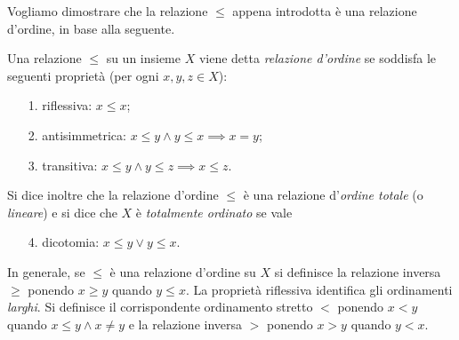 Vogliamo dimostrare che la relazione $\le$ appena introdotta 
è una relazione d'ordine, in base alla seguente.

\begin{definition}
  \label{def:ordine}%
  Una relazione
  $\le$ su un insieme $X$ viene detta
  \emph{relazione d'ordine}%
%
  se soddisfa le seguenti proprietà (per ogni $x,y,z\in X$):
  \begin{enumerate}
    \item[1.] riflessiva: $x\le x$;
    \item[2.] antisimmetrica: $x\le y \land y\le x \implies x=y$;
    \item[3.] transitiva: $x\le y \land y\le z \implies x\le z$.
  \end{enumerate}
  Si dice inoltre che la relazione d'ordine $\le$
  è una relazione d'\emph{ordine totale}%
%
  (o \emph{lineare}) 
  e si dice che $X$ è \emph{totalmente ordinato} se vale
  \begin{enumerate}
    \item[4.] dicotomia: $x\le y \lor y\le x$.
  \end{enumerate}
\end{definition}

In generale, se $\le$ è una relazione d'ordine su $X$ si definisce la 
relazione inversa $\ge$ ponendo $x\ge y$ quando $y\le x$.
La proprietà riflessiva identifica gli ordinamenti \emph{larghi}.
Si definisce il corrispondente ordinamento stretto $<$
ponendo $x < y$ quando $x\le y \land x\neq y$
e la relazione inversa $>$ ponendo $x>y$ quando $y<x$.
  
